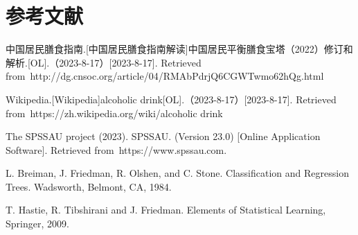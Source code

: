 \documentclass{article}
\numberwithin{equation}{subsection}
\begin{document}
{\centering\section{参考文献}}
\begingroup  %
\renewcommand{\section}[2]{}
\begin{thebibliography}{99}

中国居民膳食指南.[中国居民膳食指南解读]中国居民平衡膳食宝塔（2022）修订和解析.[OL].（2023-8-17）[2023-8-17]. Retrieved from http://dg.cnsoc.org/article/04/RMAbPdrjQ6CGWTwmo62hQg.html

Wikipedia.[Wikipedia]alcoholic drink[OL].（2023-8-17）[2023-8-17]. Retrieved from https://zh.wikipedia.org/wiki/alcoholic drink

The SPSSAU project (2023). SPSSAU. (Version 23.0) [Online Application Software]. Retrieved from https://www.spssau.com.

L. Breiman, J. Friedman, R. Olshen, and C. Stone. Classification and Regression Trees. Wadsworth, Belmont, CA, 1984.

T. Hastie, R. Tibshirani and J. Friedman. Elements of Statistical Learning, Springer, 2009.

\end{thebibliography}
\endgroup

\newpage
{\centering\section*{附录}}
\appendix
\end{document}
